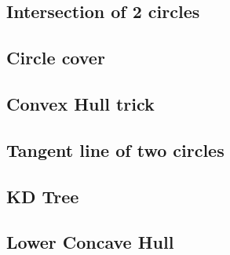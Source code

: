 \documentclass[a4paper,10pt,twocolumn,oneside]{article}
\begin{document}
%

\subsection{Intersection of 2 circles}
\subsection{Circle cover}


%

\subsection{Convex Hull trick}


\subsection{Tangent line of two circles}


\subsection{KD Tree}
%


%

\subsection{Lower Concave Hull}


% 
\end{document}
